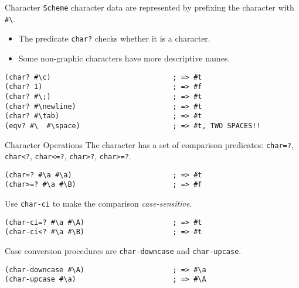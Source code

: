 \documentclass[presentation]{beamer}
\begin{document}
\begin{frame}[fragile,label={sec:orgheadline23}]{Character}
 \texttt{Scheme} character data are represented by prefixing the character
with \texttt{\#\textbackslash{}}.

\begin{itemize}
\item The predicate \texttt{char?} checks whether it is a character.
\item Some non-graphic characters have more descriptive names.
\end{itemize}

\begin{verbatim}
(char? #\c)                             ; => #t
(char? 1)                               ; => #f
(char? #\;)                             ; => #t
(char? #\newline)                       ; => #t
(char? #\tab)                           ; => #t
(eqv? #\  #\space)                      ; => #t, TWO SPACES!!
\end{verbatim}
\end{frame}

\begin{frame}[fragile,label={sec:orgheadline24}]{Character Operations}
 The character has a set of comparison predicates: \texttt{char=?},
\texttt{char<?}, \texttt{char<=?}, \texttt{char>?}, \texttt{char>=?}.

\begin{verbatim}
(char=? #\a #\a)                        ; => #t
(char>=? #\a #\B)                       ; => #f
\end{verbatim}

Use \texttt{char-ci} to make the comparison \emph{case-sensitive}.

\begin{verbatim}
(char-ci=? #\a #\A)                     ; => #t
(char-ci<? #\a #\B)                     ; => #t
\end{verbatim}

Case conversion procedures are \texttt{char-downcase} and \texttt{char-upcase}.

\begin{verbatim}
(char-downcase #\A)                     ; => #\a
(char-upcase #\a)                       ; => #\A
\end{verbatim}
\end{frame}
\end{document}

